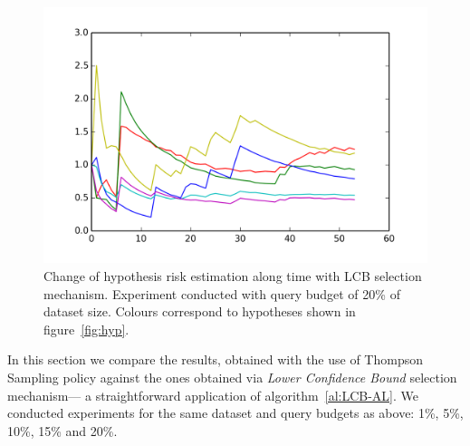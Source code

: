 \documentclass[12pt, a4paper, pdflatex, leqno, twoside]{report}
\begin{document}
\begin{figure}[htbp]
  \centering
  \includegraphics[width=0.7\linewidth]{graphics/convergence_LCB025.png}
  \begin{tiny}
    \caption{Change of hypothesis risk estimation along time with LCB selection 
mechanism. Experiment conducted with query budget of 20\% of dataset size. 
Colours correspond to hypotheses shown in 
figure~\ref{fig:hyp}.\label{fig:LCB_conv}}
  \end{tiny}
  \vspace{1cm}
\end{figure}

In this section we compare the results, obtained with the use of Thompson Sampling policy 
against the ones obtained via \emph{Lower Confidence Bound} selection mechanism---
a straightforward application of algorithm~\ref{al:LCB-AL}. We conducted 
experiments for the same dataset and query budgets as above: 1\%, 5\%, 10\%, 
15\% and 20\%.\\
\end{document}
